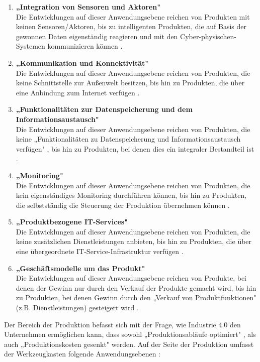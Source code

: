 \begin{enumerate}
	\item \textbf{„Integration von Sensoren und Aktoren"} \cite[S.13]{2} \\ Die Entwicklungen auf dieser Anwendungsebene reichen von Produkten mit keinen Sensoren/Aktoren, bis zu intelligenten Produkten, die auf Basis der gewonnen Daten eigenständig reagieren und mit den Cyber-physischen-Systemen kommunizieren können \cite[S.13]{2}.
	\item \textbf{„Kommunikation und Konnektivität"} \cite[S.13]{2} \\ Die Entwicklungen auf dieser Anwendungsebene reichen von Produkten, die keine Schnittstelle zur Außenwelt besitzen, bis hin zu Produkten, die über eine Anbindung zum Internet verfügen \cite[S.13]{2}.
	\item \textbf{„Funktionalitäten zur Datenspeicherung und dem Informationsaustausch"} \cite[S.13]{2} \\ Die Entwicklungen auf dieser Anwendungsebene reichen von Produkten, die keine „Funktionalitäten zu Datenspeicherung und Informationsaustausch verfügen" \cite[S.13]{2}, bis hin zu Produkten, bei denen dies ein integraler Bestandteil ist \cite[S.13]{2}.
	\item \textbf{„Monitoring"} \cite[S.13]{2} \\ Die Entwicklungen auf dieser Anwendungsebene reichen von Produkten, die kein eigenständiges Monitoring durchführen können, bis hin zu Produkten, die selbstständig die Steuerung der Produktion übernehmen können \cite[S.13]{2}.
	\item \textbf{„Produktbezogene IT-Services"} \cite[S.13]{2} \\ Die Entwicklungen auf dieser Anwendungsebene reichen von Produkten, die keine zusätzlichen Dienstleistungen anbieten, bis hin zu Produkten, die über eine übergeordnete IT-Service-Infrastruktur verfügen \cite[S.13]{2}.
	\item \textbf{„Geschäftsmodelle um das Produkt"} \cite[S.13]{2} \\ Die Entwicklungen auf dieser Anwendungsebene reichen von Produkte, bei denen der Gewinn nur durch den Verkauf der Produkte gemacht wird, bis hin zu Produkten, bei denen Gewinn durch den „Verkauf von Produktfunktionen" \cite[S.12]{2} (z.B. Dienstleistungen) gesteigert wird \cite[S.13]{2}.
\end{enumerate}
Der Bereich der Produktion befasst sich mit der Frage, wie Industrie 4.0 den Unternehmen ermöglichen kann, dass sowohl „Produktionsabläufe optimiert" \cite[S.15]{2}, als auch „Produktionskosten gesenkt" \cite[S.15]{2} werden. Auf der Seite der Produktion umfasst der Werkzeugkasten folgende Anwendungsebenen \cite[S.15]{2}:
